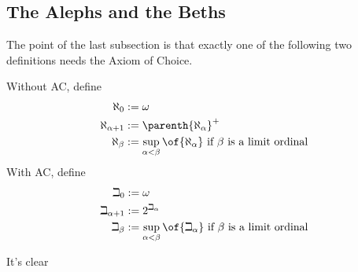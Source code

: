 \subsection{The Alephs and the Beths}

The point of the last subsection is that exactly one of the following two definitions needs the Axiom of Choice.

Without AC, define
\begin{align*}
    \aleph_0 &:= \omega \\
    \aleph_{\alpha + 1} &:= \parenth{\aleph_{\alpha}}^{+} \\
    \aleph_{\beta} &:= \sup_{\alpha < \beta}\of{\aleph_{\alpha}} \text{ if } \beta \text{ is a limit ordinal} 
\end{align*}
With AC, define
\begin{align*}
    \beth_0 &:= \omega \\
    \beth_{\alpha + 1} &:= 2^{\beth_{\alpha}} \\
    \beth_{\beta} &:= \sup_{\alpha < \beta}\of{\beth_{\alpha}} \text{ if } \beta \text{ is a limit ordinal}
\end{align*}

It's clear \sorry 
